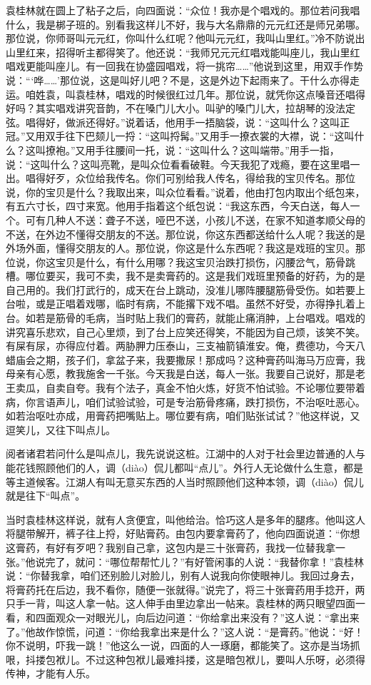 \documentclass[12pt,UTF8]{ctexbook}
\begin{document}
袁桂林就在圆上了粘子之后，向四面说：“众位！我亦是个唱戏的。那位若问我唱什么，我是梆子班的。别看我这样儿不好，我与大名鼎鼎的元元红还是师兄弟哪。那位说，你师哥叫元元红，你叫什么红呢？他叫元元红，我叫山里红。”冷不防说出山里红来，招得听主都得笑了。他还说：“我师兄元元红唱戏能叫座儿，我山里红唱戏更能叫座儿。有一回我在协盛园唱戏，将一挑帘……”他说到这里，用双手作势说：“‘哗……’那位说，这是叫好儿吧？不是，这是外边下起雨来了。干什么亦得走运。咱姓袁，叫袁桂林，唱戏的时候很红过几年。那位说，就凭你这点嗓音还唱得好吗？其实唱戏讲究音韵，不在嗓门儿大小。叫驴的嗓门儿大，拉胡琴的没法定弦。唱得好，做派还得好。”说着话，他用手一捂脑袋，说：“这叫什么？这叫正冠。”又用双手往下巴颏儿一捋：“这叫捋髯。”又用手一撩衣裳的大襟，说：“这叫什么？这叫撩袍。”又用手往腰间一托，说：“这叫什么？这叫端带。”用手一指，说：“这叫什么？这叫亮靴，是叫众位看看破鞋。今天我犯了戏瘾，要在这里唱一出。唱得好歹，众位给我传名。你们可别给我人传名，得给我的宝贝传名。那位说，你的宝贝是什么？我取出来，叫众位看看。”说着，他由打包内取出个纸包来，有五六寸长，四寸来宽。他用手指着这个纸包说：“我这东西，今天白送，每人一个。可有几种人不送：聋子不送，哑巴不送，小孩儿不送，在家不知道孝顺父母的不送，在外边不懂得交朋友的不送。那位说，你这东西都送给什么人呢？我送的是外场外面，懂得交朋友的人。那位说，你这是什么东西呢？我这是戏班的宝贝。那位说，你这宝贝是什么，有什么用哪？我这宝贝治跌打损伤，闪腰岔气，筋骨跳槽。哪位要买，我可不卖，我不是卖膏药的。这是我们戏班里预备的好药，为的是自己用的。我们打武行的，成天在台上跳动，没准儿哪阵腰腿筋骨受伤。如若要上台啦，或是正唱着戏哪，临时有病，不能撂下戏不唱。虽然不好受，亦得挣扎着上台。如若是筋骨的毛病，当时贴上我们的膏药，就能止痛消肿，上台唱戏。唱戏的讲究喜乐悲欢，自己心里烦，到了台上应笑还得笑，不能因为自己烦，该笑不笑。有屎有尿，亦得应付着。两胁胛力压泰山，三支袖箭镇淮安。俺，费德功，今天八蜡庙会之期，孩子们，拿盆子来，我要撒尿！那成吗？这种膏药叫海马万应膏，我母亲有心愿，教我施舍一千张。今天我是白送，每人一张。我要自己说好，那是老王卖瓜，自卖自夸。我有个法子，真金不怕火炼，好货不怕试验。不论哪位要带着病，你言语声儿，咱们试验试验，可是专治筋骨疼痛，跌打损伤，不治呕吐恶心。如若治呕吐亦成，用膏药把嘴贴上。哪位要有病，咱们贴张试试？”他这样说，又逗笑儿，又往下叫点儿。

阅者诸君若问什么是叫点儿，我先说说这桩。江湖中的人对于社会里边普通的人与能花钱照顾他们的人，调（diào）侃儿都叫“点儿”。外行人无论做什么生意，都是等主道候客。江湖人有叫无意买东西的人当时照顾他们这种本领，调（diào）侃儿就是往下“叫点”。

当时袁桂林这样说，就有人贪便宜，叫他给治。恰巧这人是多年的腿疼。他叫这人将腿带解开，裤子往上捋，好贴膏药。由包内要拿膏药了，他向四面说道：“你想这膏药，有好有歹吧？我别自己拿，这包内是三十张膏药，我找一位替我拿一张。”他说完了，就问：“哪位帮帮忙儿？”有好管闲事的人说：“我替你拿！”袁桂林说：“你替我拿，咱们还别脸儿对脸儿，别有人说我向你使眼神儿。我回过身去，将膏药托在后边，我不看你，随便一张就得。”说完了，将三十张膏药用手捻开，两只手一背，叫这人拿一帖。这人伸手由里边拿出一帖来。袁桂林的两只眼望四面一看，和四面观众一对眼光儿，向后边问道：“你给拿出来没有？”这人说：“拿出来了。”他故作惊慌，问道：“你给我拿出来是什么？”这人说：“是膏药。”他说：“好！你不说明，吓我一跳！”他这么一说，四面的人一琢磨，都能笑了。这亦是当场抓哏，抖搂包袱儿。不过这种包袱儿最难抖搂，这是暗包袱儿，要叫人乐呀，必须得传神，才能有人乐。
\end{document}
